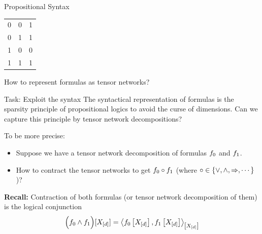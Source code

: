 \documentclass{beamer}
\begin{document}
\begin{frame}{Propositional Syntax}
{\begin{center}
\begin{tabular}{cc|c}
                    \hline
                    0                                        & 0                                        & 1          \\
                    0                                        & 1                                        & 1          \\
                    1                                        & 0                                        & 0          \\
                    1                                        & 1                                        & 1
                \end{tabular}
            \end{center}

        }

    \end{frame}


    \begin{frame}{How to represent formulas as tensor networks?}

        \begin{block}{Task: Exploit the syntax}
            The syntactical representation of formulas is the sparsity principle of propositional logics to avoid the curse of dimensions.
            Can we capture this principle by tensor network decompositions?
        \end{block}
        To be more precise:
        \begin{itemize}
            \item Suppose we have a tensor network decomposition of formulas $f_{0}$ and $f_{1}$.
            \item How to contract the tensor networks to get $f_{0}\circ f_{1}$ (where $\circ\in\{\lor,\land,\Rightarrow,\cdots\}$)?
        \end{itemize}
        \medskip
        {\bf Recall:} Contraction of both formulas (or tensor network decomposition of them) is the logical conjunction
        \begin{align*}
            \Big(f_{0}\land f_{1}\Big)[X_{[d]}] =
            \left\langle f_{0}\left[X_{[d]}\right],f_{1}\left[X_{[d]}\right]\right\rangle_{\left[ X_{[d]} \right]}
        \end{align*}
    \end{frame}
\end{document}
